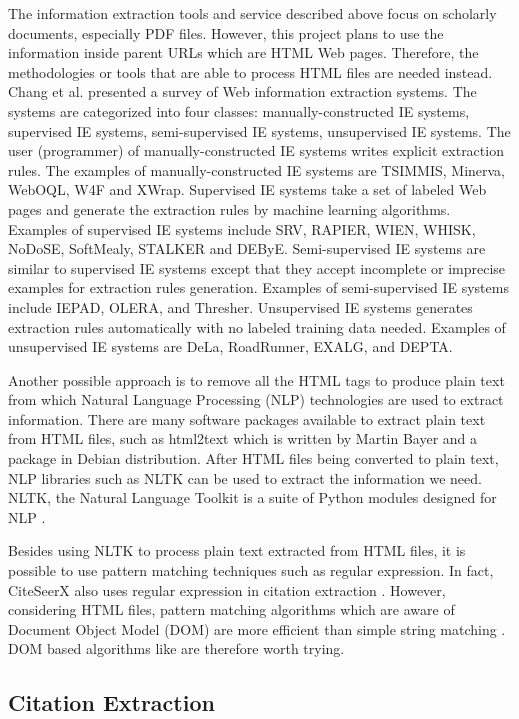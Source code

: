 \documentclass[prodmode]{acmsmall} %
\begin{document}
The information extraction tools and service described above focus on scholarly documents, especially PDF files. However, this project plans to use the information inside parent URLs which are HTML Web pages. Therefore, the methodologies or tools that are able to process HTML files are needed instead. Chang et al. presented a survey of Web information extraction systems. The systems are categorized into four classes: manually-constructed IE systems, supervised IE systems, semi-supervised IE systems, unsupervised IE systems. The user (programmer) of manually-constructed IE systems writes explicit extraction rules. The examples of manually-constructed IE systems are TSIMMIS, Minerva, WebOQL, W4F and XWrap. Supervised IE systems take a set of labeled Web pages and generate the extraction rules by machine learning algorithms. Examples of supervised IE systems include SRV, RAPIER, WIEN, WHISK, NoDoSE, SoftMealy, STALKER and DEByE. Semi-supervised IE systems are similar to supervised IE systems except that they accept incomplete or imprecise examples for extraction rules generation. Examples of semi-supervised IE systems include IEPAD, OLERA, and Thresher. Unsupervised IE systems generates extraction rules automatically with no labeled training data needed. Examples of unsupervised IE systems are DeLa, RoadRunner, EXALG, and DEPTA. \cite{Chang2006}

Another possible approach is to remove all the HTML tags to produce plain text from which Natural Language Processing (NLP) technologies are used to extract information. There are many software packages available to extract plain text from HTML files, such as html2text which is written by Martin Bayer and a package in Debian distribution. After HTML files being converted to plain text, NLP libraries such as NLTK can be used to extract the information we need. NLTK, the Natural Language Toolkit is a suite of Python modules designed for NLP \cite{Loper2002}.

Besides using NLTK to process plain text extracted from HTML files, it is possible to use pattern matching techniques such as regular expression. In fact, CiteSeerX also uses regular expression in citation extraction \cite{Wu2014b}. However, considering HTML files, pattern matching algorithms which are aware of Document Object Model (DOM) are more efficient than simple string matching \cite{Kim2007}. DOM based algorithms like \cite{Gupta2003} are therefore worth trying.


\subsection{Citation Extraction}
\end{document}

